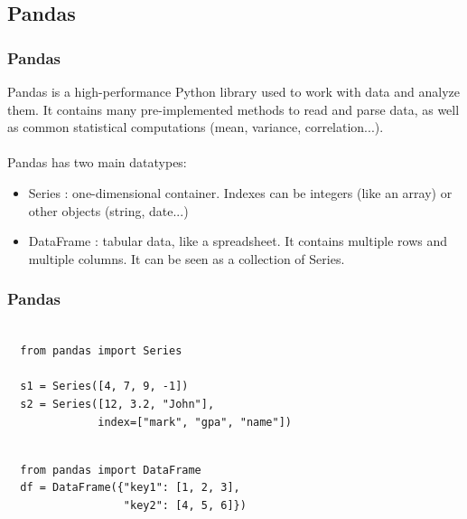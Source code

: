 \documentclass{beamer}
\begin{document}
\subsection{Pandas}
\begin{frame}
  \frametitle{Pandas}
  Pandas is a high-performance Python library used to work with data and analyze
  them. It contains many pre-implemented methods to read and parse data, as well
  as common statistical computations (mean, variance, correlation...).
  \\~\\

  Pandas has two main datatypes:
  \begin{itemize}
    \item Series : one-dimensional container. Indexes can be integers (like an
      array) or other objects (string, date...)
    \item DataFrame : tabular data, like a spreadsheet. It contains multiple
      rows and multiple columns. It can be seen as a collection of Series.
  \end{itemize}
\end{frame}

\begin{frame}[fragile]
  \frametitle{Pandas}
  \begin{example}[Series]
    \begin{verbatim}

  from pandas import Series

  s1 = Series([4, 7, 9, -1])
  s2 = Series([12, 3.2, "John"],
              index=["mark", "gpa", "name"])
    \end{verbatim}
  \end{example}

  \begin{example}[DataFrame]
    \begin{verbatim}

  from pandas import DataFrame
  df = DataFrame({"key1": [1, 2, 3],
                  "key2": [4, 5, 6]})
    \end{verbatim}
  \end{example}
\end{frame}

\end{document}
